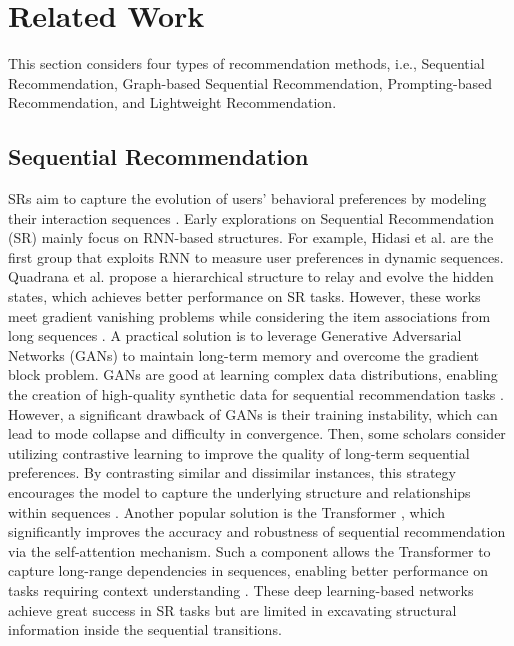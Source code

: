 \section{Related Work}
\noindent This section considers four types of recommendation methods, i.e., Sequential Recommendation, Graph-based Sequential Recommendation, Prompting-based Recommendation, and Lightweight Recommendation.


\subsection{Sequential Recommendation}
\noindent \acf{SRs} aim to capture the evolution of users' behavioral preferences by modeling their interaction sequences \cite{seq23wwwmlp}. Early explorations on Sequential Recommendation (SR) mainly focus on \ac{RNN}-based \cite{hidasi2016srnn,quadrana2017hrnn,seq22icdmrnn} structures. For example, Hidasi et al. \cite{hidasi2016srnn} are the first group that exploits RNN to measure user preferences in dynamic sequences. Quadrana et al. \cite{quadrana2017hrnn} propose a hierarchical structure to relay and evolve the hidden states, which achieves better performance on \ac{SR} tasks. However, these works meet gradient vanishing problems while considering the item associations from long sequences \cite{HuangW0023}.
A practical solution is to leverage Generative Adversarial Networks (GANs) \cite{seq21dasfaagan} to maintain long-term memory and overcome the gradient block problem. GANs are good at learning complex data distributions, enabling the creation of high-quality synthetic data for sequential recommendation tasks \cite{NiZWHQ23}. However, a significant drawback of GANs is their training instability, which can lead to mode collapse and difficulty in convergence. Then, some scholars consider utilizing contrastive learning \cite{YangHXHLL23, WangMCZLM23} to improve the quality of long-term sequential preferences. By contrasting similar and dissimilar instances, this strategy encourages the model to capture the underlying structure and relationships within sequences \cite{TianHZ0Z23}. Another popular solution is the Transformer \cite{LaiCY0C023,ZhangWC023}, which significantly improves the accuracy and robustness of sequential recommendation via the self-attention mechanism. Such a component allows the Transformer to capture long-range dependencies in sequences, enabling better performance on tasks requiring context understanding \cite{HeHSLJC18}. These deep learning-based networks achieve great success in \ac{SR} tasks but are limited in excavating structural information inside the sequential transitions.

